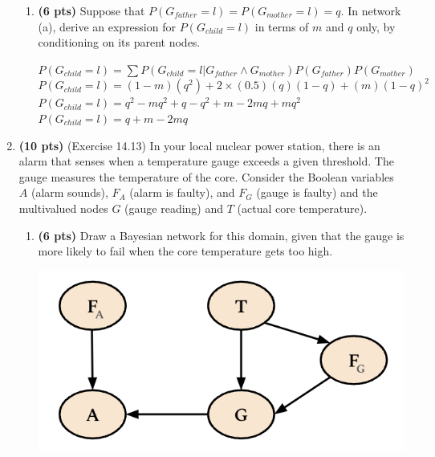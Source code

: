 \documentclass{article}
\begin{document}
\begin{enumerate}
\begin{enumerate}[label=($\alph*$)]

    \item \textbf{(6 pts)} Suppose that $P(G_{father} = l) = P(G_{mother} = l) = q$. In network (a), derive an expression for $P(G_{child} = l)$ in terms of $m$ and $q$ only, by conditioning on its parent nodes.


    \color{blue}
        $P(G_{child} = l) = \sum P(G_{child} = l | G_{father} \wedge G_{mother})P(G_{father})P(G_{mother})$\\
        $P(G_{child} = l) = (1-m)(q^2) + 2\times(0.5)(q)(1-q) + (m)(1-q)^2$\\
        $P(G_{child} = l) = q^2 - mq^2 + q - q^2 + m - 2mq + mq^2$\\
        $P(G_{child} = l) = q + m - 2mq$
    \color{black}

    
    \end{enumerate}



\item \textbf{(10 pts)} (Exercise 14.13)  In your local nuclear power station, there is an alarm that senses when a temperature gauge exceeds a given threshold. The gauge measures the temperature of the core. Consider the Boolean variables $A$ (alarm sounds), $F_A$ (alarm is faulty), and $F_G$ (gauge is faulty) and the multivalued nodes $G$ (gauge reading) and $T$ (actual core temperature).

\begin{enumerate}[label=($\alph*$)]


    \item \textbf{(6 pts)} Draw a Bayesian network for this domain, given that the gauge is more likely to fail when the core temperature gets too high.

    \includegraphics[scale=0.5]{472-PS10-Q2A.png}


\end{enumerate}
\end{enumerate}
\end{document}
